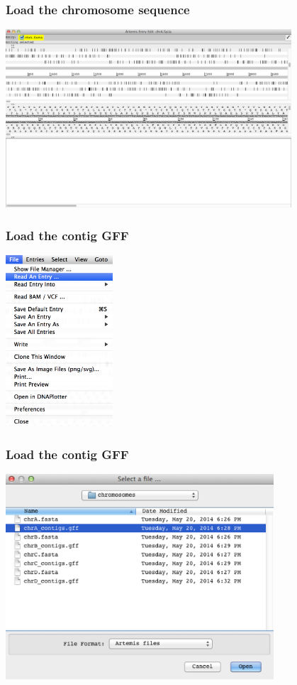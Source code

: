 \documentclass[table]{beamer}
\begin{document}
  \begin{frame}
    \frametitle{Load the chromosome sequence}
    \begin{center}
      \includegraphics[width=0.8\textwidth]{images/artemis_loaded_seq} 
    \end{center}
\end{frame}

  \begin{frame}
    \frametitle{Load the contig GFF}
    \begin{center}
      \includegraphics[width=0.3\textwidth]{images/artemis_read_entry} 
    \end{center}
\end{frame}

  \begin{frame}
    \frametitle{Load the contig GFF}
    \begin{center}
      \includegraphics[width=0.75\textwidth]{images/artemis_select_contig_gff} 
    \end{center}
\end{frame}
\end{document}
